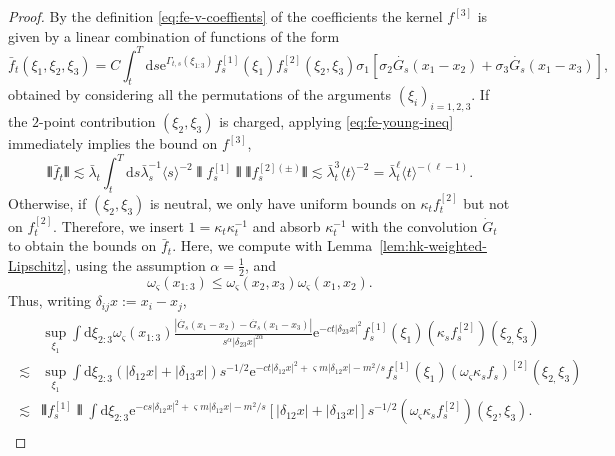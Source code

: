 \documentclass[11pt, a4paper]{scrartcl}
\numberwithin{equation}{section}
\theoremstyle{plain}
\theoremstyle{remark}
\newcommand{\assign}{:=}
\newcommand{\mathd}{\mathrm{d}}
\newcommand{\mathe}{\mathrm{e}}
\begin{document}
\begin{proof}
  By the definition \eqref{eq:fe-v-coeffients} of the coefficients the kernel
  $f^{[3]}$ is given by a linear combination of functions of the form
  \[ \bar{f}_t (\xi_1, \xi_2, \xi_3) = C \int_t^T \mathd s \mathe^{\Gamma_{t, s}
     (\xi_{1 : 3})} f^{[1]}_s (\xi_1) f^{[2]}_s (\xi_2, \xi_3) \sigma_1
     [\sigma_2 \dot{G_s} (x_1 - x_2) + \sigma_3 \dot{G_s} (x_1 - x_3)],\]
  obtained by considering all the permutations of the arguments $(\xi_i)_{i =
  1, 2, 3}$. If the $2$-point contribution $(\xi_2, \xi_3)$ is charged,
  applying \eqref{eq:fe-young-ineq} immediately implies the bound on
  $f^{[3]}$,
  \[ \interleave \bar{f}_t \interleave \lesssim \bar{\lambda}_t  \int_t^T \mathd s
     \bar{\lambda}_s^{- 1} \langle s \rangle^{- 2} \interleave f_s^{[1]} \interleave
     \interleave f_s^{[2] (\pm)} \interleave \lesssim \bar{\lambda}_t^3 \langle t
     \rangle^{- 2} = \bar{\lambda}_t^{\ell} \langle t \rangle^{- (\ell - 1)} . \]
  Otherwise, if $(\xi_2, \xi_3)$ is neutral, we only have uniform bounds on
  $\kappa_t f_t^{[2]}$ but not on $f^{[2]}_t$. Therefore, we insert $1 = \kappa_t \kappa_t^{-
  1}$ and absorb $\kappa_t^{- 1}$ with the convolution $\dot{G}_t$ to obtain the
  bounds on $\bar{f}_t$. Here, we compute with
  Lemma~\ref{lem:hk-weighted-Lipschitz}, using the assumption $\alpha =
  \frac{1}{2}$, and
  \[ \omega_{\varsigma} (x_{1 : 3}) \leqslant \omega_{\varsigma} (x_2, x_3)
     \omega_{\varsigma} (x_1, x_2) . \]
  Thus, writing $\delta_{i j} x \assign x_i - x_j$,
    \begin{align}
      \begin{split}
        & \sup_{\xi_1}  \int \mathd \xi_{2 : 3} \omega_{\varsigma} (x_{1 : 3})
        \frac{| \dot{G_s} (x_1 - x_2) - \dot{G_s} (x_1 - x_3) |}{s^{\alpha} |
        \delta_{23} x |^{2 \alpha}} \mathe^{- ct | \delta_{23} x |^2} f_s^{[1]}
        (\xi_1) (\kappa_s f_s^{[2]}) (\xi_{2,} \xi_3)\\
        \lesssim & \sup_{\xi_1}  \int \mathd \xi_{2 : 3} (| \delta_{12} x | + |
        \delta_{13} x |) s^{- 1 / 2} \mathe^{- ct | \delta_{12} x |^2 +
        \varsigma m | \delta_{12} x | - m^2 / s} f_s^{[1]} (\xi_1) 
        (\omega_{\varsigma} \kappa_s f_s)^{[2]} (\xi_{2,} \xi_3)\\
        \lesssim & \interleave f_s^{[1]} \interleave  \int \mathd \xi_{2 : 3}
        \mathe^{- cs | \delta_{12} x |^2 + \varsigma m | \delta_{12} x | - m^2 /
        s} [| \delta_{12} x | + | \delta_{13} x |] s^{- 1 / 2} (\omega_{\varsigma}\kappa_s f^{[2]}_s)
        (\xi_2, \xi_3).\label{eq:dg-dx}

\end{split}
\end{align}
\end{proof}
\end{document}
